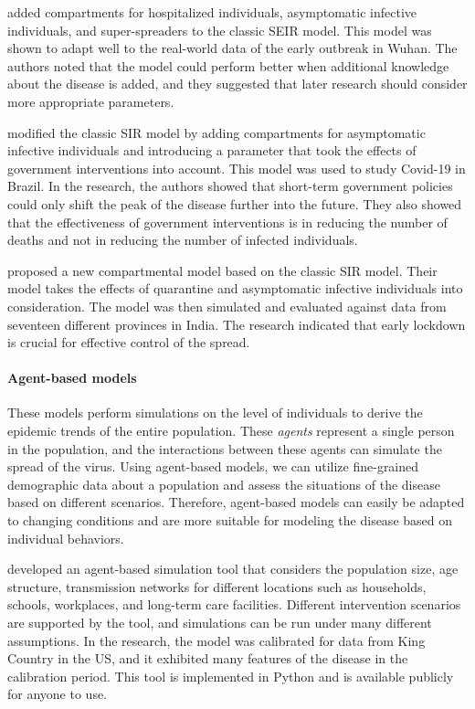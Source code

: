 \citeauthor{ndairouMathematicalModelingCOVID192020} \cite{ndairouMathematicalModelingCOVID192020} added compartments for hospitalized individuals, asymptomatic infective individuals, and super-spreaders to the classic SEIR model.
This model was shown to adapt well to the real-world data of the early outbreak in Wuhan.
The authors noted that the model could perform better when additional knowledge about the disease is added, and they suggested that later research should consider more appropriate parameters.

\citeauthor{bastosModelingForecastingEarly2020} \cite{bastosModelingForecastingEarly2020} modified the classic SIR model by adding compartments for asymptomatic infective individuals and introducing a parameter that took the effects of government interventions into account.
This model was used to study Covid-19 in Brazil.
In the research, the authors showed that short-term government policies could only shift the peak of the disease further into the future.
They also showed that the effectiveness of government interventions is in reducing the number of deaths and not in reducing the number of infected individuals.

\citeauthor{sarkarModelingForecastingCOVID192020} \cite{sarkarModelingForecastingCOVID192020} proposed a new compartmental model based on the classic SIR model.
Their model takes the effects of quarantine and asymptomatic infective individuals into consideration.
The model was then simulated and evaluated against data from seventeen different provinces in India.
The research indicated that early lockdown is crucial for effective control of the spread.

\paragraph{Agent-based models}
These models perform simulations on the level of individuals to derive the epidemic trends of the entire population.
These \textit{agents} represent a single person in the population, and the interactions between these agents can simulate the spread of the virus.
Using agent-based models, we can utilize fine-grained demographic data about a population and assess the situations of the disease based on different scenarios.
Therefore, agent-based models can easily be adapted to changing conditions and are more suitable for modeling the disease based on individual behaviors.

\citeauthor{kerrCovasimAgentbasedModel2021} \cite{kerrCovasimAgentbasedModel2021} developed an agent-based simulation tool that considers the population size, age structure, transmission networks for different locations such as households, schools, workplaces, and long-term care facilities.
Different intervention scenarios are supported by the tool, and simulations can be run under many different assumptions.
In the research, the model was calibrated for data from King Country in the \gls{US}, and it exhibited many features of the disease in the calibration period.
This tool is implemented in Python and is available publicly for anyone to use.

